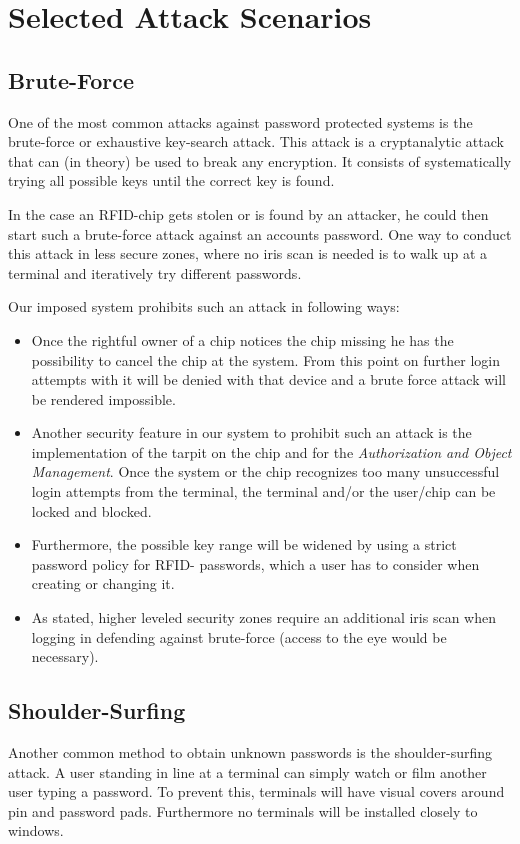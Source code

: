 \documentclass[12pt,a4paper,titlepage,oneside]{scrartcl}
\begin{document}
\section{Selected Attack Scenarios}
\subsection{Brute-Force}
One of the most common attacks against password protected systems is the brute-force or exhaustive key-search attack. This attack is a cryptanalytic attack that can (in theory) be used to break any encryption. It consists of systematically trying all possible keys until the correct key is found.

In the case an RFID-chip gets stolen or is found by an attacker, he could then start such a brute-force attack against an accounts password. One way to conduct this attack in less secure zones, where no iris scan is needed is to walk up at a terminal and iteratively try different passwords.

Our imposed system prohibits such an attack in following ways:
\begin{itemize}
   \item Once the rightful owner of a chip notices the chip missing he has the possibility to cancel the chip at the system. From this point on further login attempts with it will be denied with that device and a brute force attack will be rendered impossible.
   \item Another security feature in our system to prohibit such an attack is the implementation of the tarpit on the chip and for the \emph{Authorization and Object Management}. Once the system or the chip recognizes too many unsuccessful login attempts from the terminal, the terminal and/or the user/chip can be locked and blocked.
   \item Furthermore, the possible key range will be widened by using a strict password policy for RFID- passwords, which a user has to consider when creating or changing it.
   \item As stated, higher leveled security zones require an additional iris scan when logging in defending against brute-force (access to the eye would be necessary). 
\end{itemize}

\subsection{Shoulder-Surfing}
Another common method to obtain unknown passwords is the shoulder-surfing attack. A user standing in line at a terminal can simply watch or film another user typing a password. To prevent this, terminals will have visual covers around pin  and password pads. Furthermore no terminals will be installed closely to windows.
\end{document}
